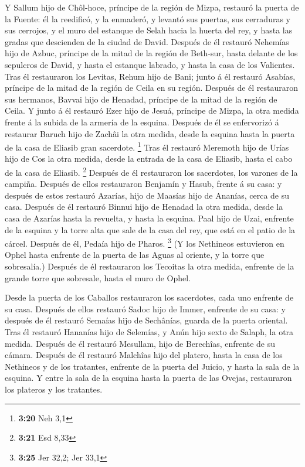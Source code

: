  Y Sallum hijo de Chôl-hoce, príncipe de la región de
Mizpa, restauró la puerta de la Fuente: él la reedificó, y la enmaderó,
y levantó sus puertas, sus cerraduras y sus cerrojos, y el muro del
estanque de Selah hacia la huerta del rey, y hasta las gradas que
descienden de la ciudad de David.  Después de él restauró
Nehemías hijo de Azbuc, príncipe de la mitad de la región de Beth-sur,
hasta delante de los sepulcros de David, y hasta el estanque labrado, y
hasta la casa de los Valientes.  Tras él restauraron los
Levitas, Rehum hijo de Bani; junto á él restauró Asabías, príncipe de la
mitad de la región de Ceila en su región.  Después de él
restauraron sus hermanos, Bavvai hijo de Henadad, príncipe de la mitad
de la región de Ceila.  Y junto á él restauró Ezer hijo
de Jesuá, príncipe de Mizpa, la otra medida frente á la subida de la
armería de la esquina.  Después de él se enfervorizó á
restaurar Baruch hijo de Zachâi la otra medida, desde la esquina hasta
la puerta de la casa de Eliasib gran sacerdote. \footnote{\textbf{3:20}
  Neh 3,1}  Tras él restauró Meremoth hijo de Urías hijo
de Cos la otra medida, desde la entrada de la casa de Eliasib, hasta el
cabo de la casa de Eliasib. \footnote{\textbf{3:21} Esd 8,33}
 Después de él restauraron los sacerdotes, los varones de
la campiña.  Después de ellos restauraron Benjamín y
Hasub, frente á su casa: y después de estos restauró Azarías, hijo de
Maasías hijo de Ananías, cerca de su casa.  Después de él
restauró Binnui hijo de Henadad la otra medida, desde la casa de Azarías
hasta la revuelta, y hasta la esquina.  Paal hijo de
Uzai, enfrente de la esquina y la torre alta que sale de la casa del
rey, que está en el patio de la cárcel. Después de él, Pedaía hijo de
Pharos. \footnote{\textbf{3:25} Jer 32,2; Jer 33,1}  (Y
los Nethineos estuvieron en Ophel hasta enfrente de la puerta de las
Aguas al oriente, y la torre que sobresalía.)  Después de
él restauraron los Tecoitas la otra medida, enfrente de la grande torre
que sobresale, hasta el muro de Ophel.

 Desde la puerta de los Caballos restauraron los
sacerdotes, cada uno enfrente de su casa.  Después de
ellos restauró Sadoc hijo de Immer, enfrente de su casa: y después de él
restauró Semaías hijo de Sechânías, guarda de la puerta oriental.
 Tras él restauró Hananías hijo de Selemías, y Anún hijo
sexto de Salaph, la otra medida. Después de él restauró Mesullam, hijo
de Berechîas, enfrente de su cámara.  Después de él
restauró Malchîas hijo del platero, hasta la casa de los Nethineos y de
los tratantes, enfrente de la puerta del Juicio, y hasta la sala de la
esquina.  Y entre la sala de la esquina hasta la puerta
de las Ovejas, restauraron los plateros y los tratantes.

